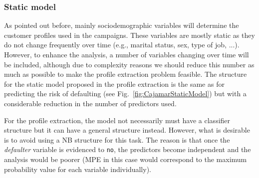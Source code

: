 \subsubsection*{Static model}
\label{sec:StaticModel}

As pointed out before, mainly sociodemographic variables will determine the customer profiles used in the campaigns. These variables are mostly static as they do not change frequently over time (e.g., marital status, sex, type of job, ...). However, to enhance the analysis, a number of  variables changing over time will be included, although due to complexity reasons we should reduce this number as much as possible to make the profile extraction problem feasible.
The structure for the static model proposed in the profile extraction is the same as for predicting the risk of defaulting (see Fig.~\ref{fig:CajamarStaticModel}) but with a considerable reduction in the number of predictors used. 





%

For the profile extraction, the model not necessarily must have a classifier structure but it can have a general structure instead. However, what is desirable is to avoid using a NB structure for this task. The reason is that once the \emph{defaulter} variable is evidenced to \texttt{no}, the predictors become independent and the analysis would be poorer (MPE in this case would correspond to the maximum probability value for each variable individually).




